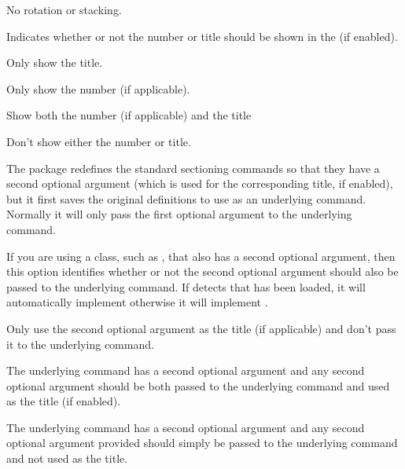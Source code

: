 \documentclass[fontsize=12pt]{scrbook}
\begin{document}
No rotation or stacking.



Indicates whether or not the number or title should be shown in
the  (if enabled).


Only show the title.


Only show the number (if applicable).


Show both the number (if applicable) and the title


Don't show either the number or title.


The  package redefines the standard sectioning
commands so that they have a second optional argument (which is used
for the corresponding  title, if enabled), but it first
saves the original definitions to use as an underlying command.
Normally it will only pass the first optional argument to the
underlying command.

If you are using a class, such as , that also has a second optional
argument, then this option identifies whether or not the second
optional argument should also be passed to the underlying command.
If  detects that  has been loaded, it will
automatically implement
otherwise it will implement
.


Only use the second optional argument as the  title
(if applicable) and don't pass it to the underlying command.


The underlying command has a second optional argument and any second
optional argument should be both passed to the underlying command
and used as the  title (if enabled).


The underlying command has a second optional
argument and any second optional argument provided should simply be passed
to the underlying command and not used as the  title.
\end{document}
